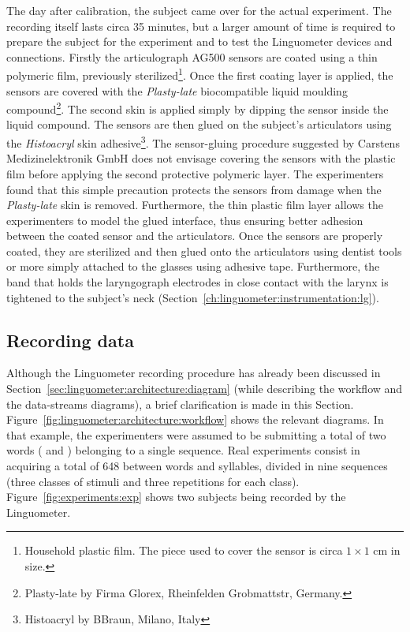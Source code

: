 
The day after calibration, the subject came over for the actual
experiment.
The recording itself lasts circa 35 minutes, but a larger amount of time is
required to prepare the subject for the experiment and to test the Linguometer
devices and connections.
Firstly the articulograph AG500 sensors are coated using a thin polymeric 
film, previously sterilized\footnote{Household plastic film. The piece used
to cover the sensor is 
circa $1\times1$ cm in size.}. Once the first coating layer is applied, the 
sensors are covered with the \emph{Plasty-late} biocompatible liquid moulding 
compound\footnote{Plasty-late by Firma Glorex, Rheinfelden Grobmattstr, 
Germany.}. The second skin is applied simply by dipping the sensor inside the
liquid compound.
The sensors are then glued on the subject's articulators using the
\emph{Histoacryl} skin adhesive\footnote{Histoacryl by BBraun, Milano, Italy}.
The sensor-gluing procedure suggested by Carstens Medizinelektronik GmbH does 
not envisage covering the sensors with the plastic film before 
applying the second protective polymeric layer.
The experimenters found that this simple precaution protects the sensors
from damage when the \emph{Plasty-late} skin is removed. Furthermore, the thin
plastic film layer allows the experimenters to model the glued interface,
thus ensuring better adhesion between the coated sensor and the articulators.
Once the sensors are properly coated, they are sterilized and then 
glued onto the articulators using dentist tools or more simply attached
to the glasses using adhesive tape.
Furthermore, the band that holds the laryngograph electrodes in close contact
with the larynx is tightened to the subject's neck
(Section~\ref{ch:linguometer:instrumentation:lg}).
\subsection{Recording data}
\label{sec:experiments:recording}
Although the Linguometer recording procedure has already been discussed in
Section~\ref{sec:linguometer:architecture:diagram} (while describing the 
workflow and the data-streams diagrams), a brief clarification is made in 
this Section. 
Figure~\ref{fig:linguometer:architecture:workflow} shows the relevant
diagrams. In that example, the 
experimenters were
assumed to be submitting a total of two words ( and ) 
belonging to a single sequence.
Real experiments consist in acquiring a total of 648 between words and
syllables, divided in nine sequences (three classes of stimuli and
three repetitions for each class).
Figure~\ref{fig:experiments:exp} shows two subjects being recorded by the
Linguometer.


